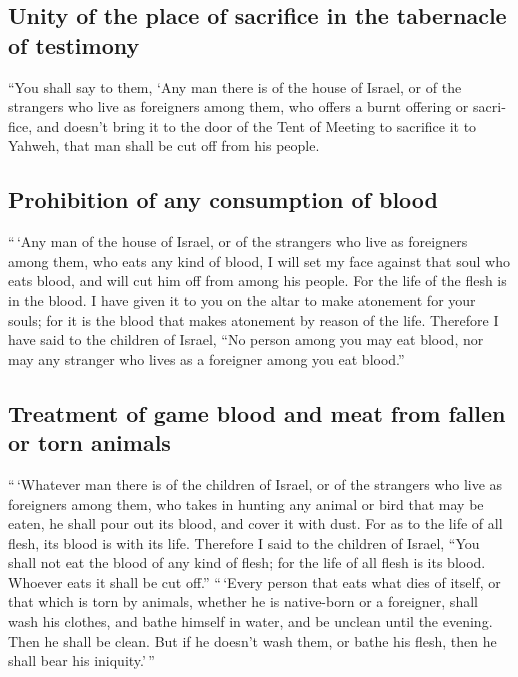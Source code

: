 \begin{paracol}{2}
\begin{otherlanguage}{english}
\hypertarget{unity-of-the-place-of-sacrifice-in-the-tabernacle-of-testimony}{%
\subsection{Unity of the place of sacrifice in the tabernacle of
testimony}\label{unity-of-the-place-of-sacrifice-in-the-tabernacle-of-testimony}}

 ``You shall say to them, `Any man there is of the house
of Israel, or of the strangers who live as foreigners among them, who
offers a burnt offering or sacrifice,  and doesn't bring
it to the door of the Tent of Meeting to sacrifice it to Yahweh, that
man shall be cut off from his people.

\hypertarget{prohibition-of-any-consumption-of-blood}{%
\subsection{Prohibition of any consumption of
blood}\label{prohibition-of-any-consumption-of-blood}}

 ``\,`Any man of the house of Israel, or of the strangers
who live as foreigners among them, who eats any kind of blood, I will
set my face against that soul who eats blood, and will cut him off from
among his people.  For the life of the flesh is in the
blood. I have given it to you on the altar to make atonement for your
souls; for it is the blood that makes atonement by reason of the life.
 Therefore I have said to the children of Israel, ``No
person among you may eat blood, nor may any stranger who lives as a
foreigner among you eat blood.''

\hypertarget{treatment-of-game-blood-and-meat-from-fallen-or-torn-animals}{%
\subsection{Treatment of game blood and meat from fallen or torn
animals}\label{treatment-of-game-blood-and-meat-from-fallen-or-torn-animals}}

 ``\,`Whatever man there is of the children of Israel, or
of the strangers who live as foreigners among them, who takes in hunting
any animal or bird that may be eaten, he shall pour out its blood, and
cover it with dust.  For as to the life of all flesh, its
blood is with its life. Therefore I said to the children of Israel,
``You shall not eat the blood of any kind of flesh; for the life of all
flesh is its blood. Whoever eats it shall be cut off.'' 
``\,`Every person that eats what dies of itself, or that which is torn
by animals, whether he is native-born or a foreigner, shall wash his
clothes, and bathe himself in water, and be unclean until the evening.
Then he shall be clean.  But if he doesn't wash them, or
bathe his flesh, then he shall bear his iniquity.'\,''


\end{otherlanguage}
\end{paracol}
